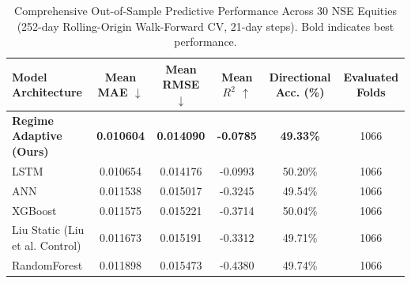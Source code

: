 \begin{table}[t]
\centering
\caption{Comprehensive Out-of-Sample Predictive Performance Across 30 NSE Equities (252-day Rolling-Origin Walk-Forward CV, 21-day steps). Bold indicates best performance.}
\label{tab:main_results}
\begin{tabular}{lccccc}
\hline
\textbf{Model Architecture} & \textbf{Mean MAE $\downarrow$} & \textbf{Mean RMSE $\downarrow$} & \textbf{Mean $R^2$ $\uparrow$} & \textbf{Directional Acc. (\%)} & \textbf{Evaluated Folds} \\
\hline
\textbf{Regime Adaptive (Ours)} & \textbf{0.010604} & \textbf{0.014090} & \textbf{-0.0785} & \textbf{49.33\%} & 1066 \\
LSTM & 0.010654 & 0.014176 & -0.0993 & 50.20\% & 1066 \\
ANN & 0.011538 & 0.015017 & -0.3245 & 49.54\% & 1066 \\
XGBoost & 0.011575 & 0.015221 & -0.3714 & 50.04\% & 1066 \\
Liu Static (Liu et al. Control) & 0.011673 & 0.015191 & -0.3312 & 49.71\% & 1066 \\
RandomForest & 0.011898 & 0.015473 & -0.4380 & 49.74\% & 1066 \\
\hline
\end{tabular}
\end{table}

